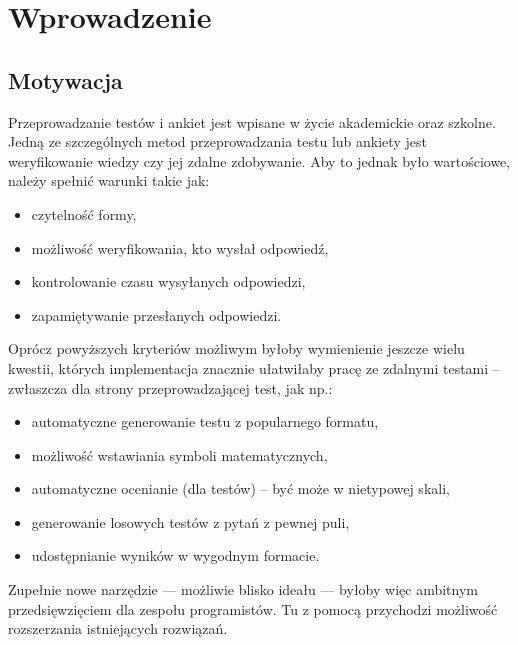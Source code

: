 \chapter{Wprowadzenie}%
\section{Motywacja}
Przeprowadzanie testów i ankiet jest wpisane w życie akademickie oraz szkolne. Jedną ze szczególnych metod przeprowadzania testu lub ankiety jest weryfikowanie wiedzy czy jej zdalne zdobywanie.
Aby to jednak było wartościowe, należy spełnić warunki takie jak:
\begin{itemize}
\item czytelność formy,
\item możliwość weryfikowania, kto wysłał odpowiedź,
\item kontrolowanie czasu wysyłanych odpowiedzi,
\item zapamiętywanie przesłanych odpowiedzi.
\end{itemize}
Oprócz powyższych kryteriów możliwym byłoby wymienienie jeszcze wielu kwestii, których implementacja znacznie ułatwiłaby pracę ze zdalnymi testami -- zwłaszcza dla strony przeprowadzającej test, jak np.:
\begin{itemize}
\item automatyczne generowanie testu z popularnego formatu,
\item możliwość wstawiania symboli matematycznych,
\item automatyczne ocenianie (dla testów)  -- być może w nietypowej skali,
\item generowanie losowych testów z pytań z pewnej puli,
\item udostępnianie wyników w wygodnym formacie.
\end{itemize}
Zupełnie nowe narzędzie --- możliwie blisko ideału --- byłoby więc ambitnym przedsięwzięciem dla zespołu programistów. Tu z pomocą przychodzi możliwość rozszerzania istniejących rozwiązań.

